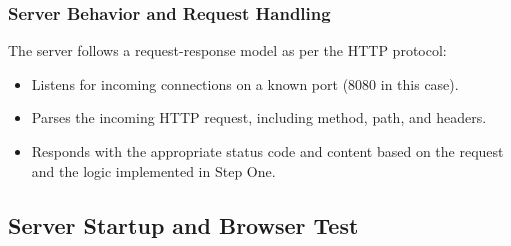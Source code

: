 \documentclass{article}
\begin{document}
\subsubsection*{Server Behavior and Request Handling}
The server follows a request-response model as per the HTTP protocol:
\begin{itemize}
    \item Listens for incoming connections on a known port (8080 in this case).
    \item Parses the incoming HTTP request, including method, path, and headers.
    \item Responds with the appropriate status code and content based on the request and the logic implemented in Step One.
\end{itemize}

\subsection*{Server Startup and Browser Test}
\end{document}
